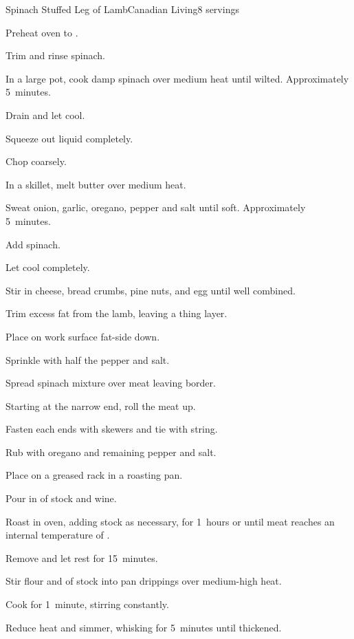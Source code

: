 \begin{recipe}{Spinach Stuffed Leg of Lamb}{Canadian Living}{8 servings}
\begin{directions}
\item Preheat oven to .
\item Trim and rinse spinach.
\item In a large pot, cook damp spinach over medium heat until wilted. Approximately 5~minutes.
\item Drain and let cool.
\item Squeeze out liquid completely.
\item Chop coarsely.
\item In a skillet, melt butter over medium heat.
\item Sweat onion, garlic, oregano, pepper and salt until soft. Approximately 5~minutes.
\item Add spinach.
\item Let cool completely.
\item Stir in cheese, bread crumbs, pine nuts, and egg until well combined.
\item Trim excess fat from the lamb, leaving a thing layer.
\item Place on work surface fat-side down.
\item Sprinkle with half the pepper and salt.
\item Spread spinach mixture over meat leaving  border.
\item Starting at the narrow end, roll the meat up.
\item Fasten each ends with skewers and tie with string.
\item Rub with oregano and remaining pepper and salt.
\item Place on a greased rack in a roasting pan.
\item Pour in  of stock and wine.
\item Roast in oven, adding stock as necessary, for 1\half~hours or until meat reaches an internal temperature of .
\item Remove and let rest for 15~minutes.
\item Stir flour and  of stock into pan drippings over medium-high heat.
\item Cook for 1~minute, stirring constantly.
\item Reduce heat and simmer, whisking for 5~minutes until thickened.
\end{directions}

\end{recipe}
